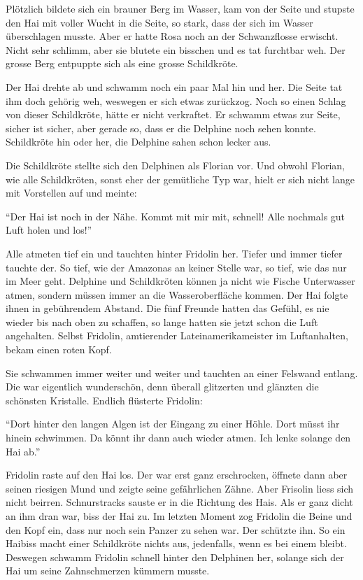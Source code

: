 Plötzlich bildete sich ein brauner Berg im Wasser, kam von der Seite und stupste den Hai mit voller Wucht in die Seite, so stark, dass der sich im Wasser überschlagen musste.  Aber er hatte Rosa noch an der Schwanzflosse erwischt. Nicht sehr schlimm, aber sie blutete ein bisschen und es tat furchtbar weh. Der grosse Berg entpuppte sich als eine grosse Schildkröte. 

Der Hai drehte ab und schwamm noch ein paar Mal hin und her. Die Seite tat ihm doch gehörig weh, weswegen er sich etwas zurückzog. Noch so einen Schlag von dieser Schildkröte, hätte er nicht verkraftet. Er schwamm etwas zur Seite, sicher ist sicher, aber gerade so, dass er die Delphine noch sehen konnte. Schildkröte hin oder her, die Delphine sahen schon lecker aus.

Die Schildkröte stellte sich den Delphinen als Florian vor. Und obwohl Florian, wie alle Schildkröten, sonst eher der gemütliche Typ war, hielt er sich nicht lange mit Vorstellen auf und meinte: 

\enquote{Der Hai ist noch in der Nähe. Kommt mit mir mit, schnell! Alle nochmals gut Luft holen und los!}

Alle atmeten tief ein und tauchten hinter Fridolin her. Tiefer und immer tiefer tauchte der. So tief, wie der Amazonas an keiner Stelle war, so tief, wie das nur im Meer geht. Delphine und Schildkröten können ja nicht wie Fische Unterwasser atmen, sondern müssen immer an die Wasseroberfläche kommen. Der Hai folgte ihnen in gebührendem Abstand. Die fünf Freunde hatten das Gefühl, es nie wieder bis nach oben zu schaffen, so lange hatten sie jetzt schon die Luft angehalten. Selbst Fridolin, amtierender Lateinamerikameister im Luftanhalten, bekam einen roten Kopf. 

Sie schwammen immer weiter und weiter und tauchten an einer Felswand entlang. Die war eigentlich wunderschön, denn überall glitzerten und glänzten die schönsten Kristalle. Endlich flüsterte Fridolin:

\enquote{Dort hinter den langen Algen ist der Eingang zu einer Höhle. Dort müsst ihr hinein schwimmen. Da könnt ihr dann auch wieder atmen. Ich lenke solange den Hai ab.}

Fridolin raste auf den Hai los. Der war erst ganz erschrocken, öffnete dann aber seinen riesigen Mund und zeigte seine gefährlichen Zähne. Aber Frisolin liess sich nicht beirren. Schnurstracks sauste er in die Richtung des Hais. Als er ganz dicht an ihm dran war, biss der Hai zu. Im letzten Moment zog Fridolin die Beine und den Kopf ein, dass nur noch sein Panzer zu sehen war. Der schützte ihn. So ein Haibiss macht einer Schildkröte nichts aus, jedenfalls, wenn es bei einem bleibt. Deswegen schwamm Fridolin schnell hinter den Delphinen her, solange sich der Hai um seine Zahnschmerzen kümmern musste.

